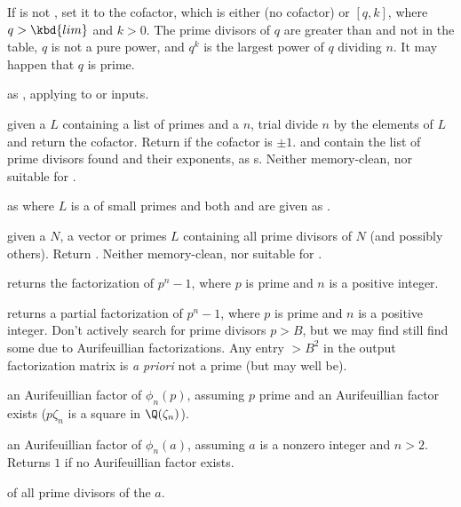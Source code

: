 If  is not , set it to the cofactor, which is either
 (no cofactor) or $[q,k]$, where $q > \kbd{lim}$ and $k > 0$.
The prime divisors of $q$ are greater than  and not in the
 table, $q$ is not a pure power, and $q^k$ is the largest
power of $q$ dividing $n$. It may happen that $q$ is prime.

 as , applying to
 or  inputs.

 given a 
$L$ containing a list of primes and a  $n$, trial divide
$n$ by the elements of $L$ and return the cofactor. Return  if the
cofactor is $\pm 1$.  and  contain the list of prime divisors
found and their exponents, as s. Neither memory-clean, nor
suitable for .

 as
 where $L$ is a  of small primes and both
 and  are given as .

 given a  $N$, a vector or
primes $L$ containing all prime divisors of $N$ (and possibly others). Return
. Neither memory-clean, nor suitable for .

 returns the factorization of $p^n-1$,
where $p$ is prime and $n$ is a positive integer.

 returns a partial
factorization of $p^n-1$, where $p$ is prime and $n$ is a positive integer.
Don't actively search for prime divisors $p > B$, but we may find still find
some due to Aurifeuillian factorizations. Any entry $> B^2$ in the output
factorization matrix is \emph{a priori} not a prime (but may well be).

 an Aurifeuillian factor
of $\phi_n(p)$, assuming $p$ prime and an Aurifeuillian factor exists
($p \zeta_n$ is a square in $\Q(\zeta_n)$).

 an Aurifeuillian factor of
$\phi_n(a)$, assuming $a$ is a nonzero integer and $n > 2$. Returns $1$
if no Aurifeuillian factor exists.

  of all prime divisors of the
 $a$.

